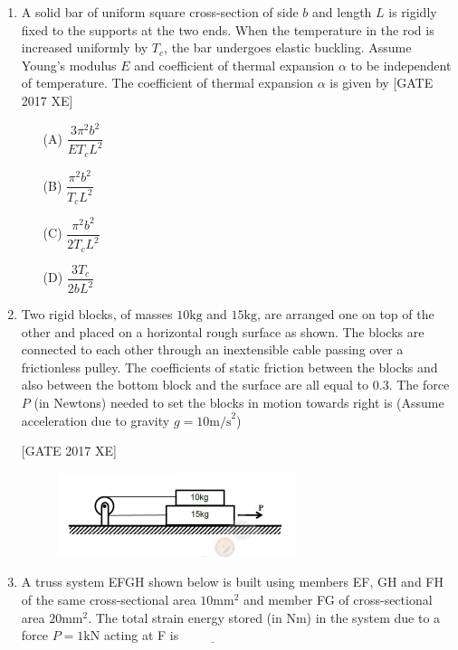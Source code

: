 \documentclass[journal,12pt,onecolumn]{IEEEtran}
\theoremstyle{remark}
\begin{document}
\begin{enumerate}
\item A solid bar of uniform square cross-section of side $b$ and length $L$ is rigidly fixed to the supports at the two ends. When the temperature in the rod is increased uniformly by $T_c$, the bar undergoes elastic buckling. Assume Young's modulus $E$ and coefficient of thermal expansion $\alpha$ to be independent of temperature. The coefficient of thermal expansion $\alpha$ is given by
\hfill [GATE 2017 XE]

\begin{multicols}{2}
    \begin{enumerate}
        \item[(A)] $\dfrac{3\pi^2 b^2}{E T_c L^2}$
        \item[(B)] $\dfrac{\pi^2 b^2}{T_c L^2}$
        \item[(C)] $\dfrac{\pi^2 b^2}{2 T_c L^2}$
        \item[(D)] $\dfrac{3T_c}{2b L^2}$
    \end{enumerate}
\end{multicols}



\item Two rigid blocks, of masses $10\text{kg}$ and $15\text{kg}$, are arranged one on top of the other and placed on a horizontal rough surface as shown. The blocks are connected to each other through an inextensible cable passing over a frictionless pulley. The coefficients of static friction between the blocks and also between the bottom block and the surface are all equal to $0.3$. The force $P$ (in Newtons) needed to set the blocks in motion towards right is
(Assume acceleration due to gravity $g = 10 \text{m/s}^2$)

\hfill [GATE 2017 XE]

\begin{figure}[H]
    \centering
    \includegraphics[width=0.5\linewidth]{figs/fig19.png}
    \caption{}
    \label{fig:placeholder}
\end{figure}
\item A truss system EFGH shown below is built using members EF, GH and FH of the same cross-sectional area $10\text{mm}^2$ and member FG of cross-sectional area $20\text{mm}^2$. The total strain energy stored (in Nm) in the system due to a force $P=1\text{kN}$ acting at F is $\underline{\hspace{2cm}}$


\end{enumerate}
\end{document}
